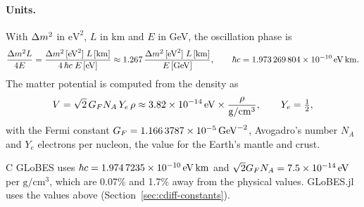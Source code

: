 \paragraph{Units.} With $\Delta m^2_{}$ in $\mathrm{eV}^2$, $L$ in km and $E$ in GeV, the
oscillation phase is
\begin{equation}
\frac{\Delta m^2_{}L}{4E} = \frac{\Delta m^2_{}\,[\mathrm{eV}^2]\;L\,[\mathrm{km}]}{4\,\hbar c\;E\,[\mathrm{eV}]}
  \approx 1.267\,\frac{\Delta m^2_{}\,[\mathrm{eV}^2]\;L\,[\mathrm{km}]}{E\,[\mathrm{GeV}]},
\qquad \hbar c = 1.973\,269\,804\times10^{-10}\,\mathrm{eV}\,\mathrm{km} .
\end{equation}
The matter potential is computed from the density as
\begin{equation}
V = \sqrt2\,G_F N_A\, Y_e\,\rho
  \approx 3.82\times10^{-14}\,\mathrm{eV}\times\frac{\rho}{\mathrm{g/cm^3}},
\qquad Y_e = \tfrac12 ,
\label{eq:potential}
\end{equation}
with the Fermi constant $G_F = 1.166\,3787\times10^{-5}\,\mathrm{GeV}^{-2}$, Avogadro's
number $N_A$ and $Y_e$ electrons per nucleon, the value for the Earth's mantle
and crust.

\begin{cdiff}
C GLoBES uses $\hbar c = 1.974\,7235\times10^{-10}\,\mathrm{eV}\,\mathrm{km}$ and
$\sqrt2 G_F N_A = 7.5\times10^{-14}\,\mathrm{eV}$ per $\mathrm{g/cm^3}$, which are 0.07\%
and 1.7\% away from the physical values. GLoBES.jl uses the values above
(Section~\ref{sec:cdiff-constants}).
\end{cdiff}


